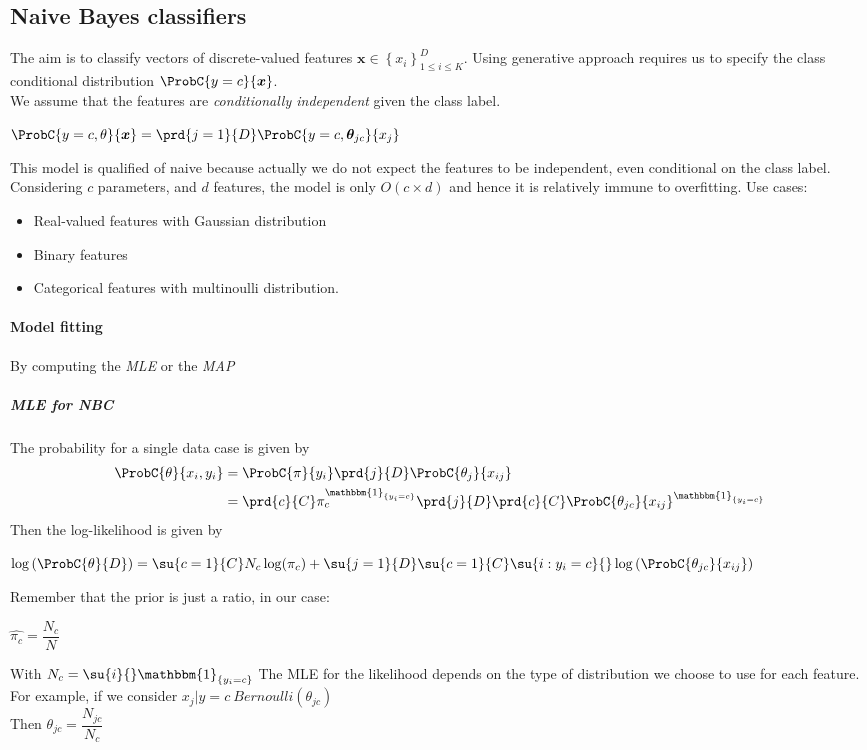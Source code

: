 \subsection{Naive Bayes classifiers}
The aim is to classify vectors of discrete-valued features $\bm{x}\in 
\left\{x_{i}\right\}^{D}_{1\leq i\leq K}$. Using generative approach requires us to 
specify the class conditional distribution $\ProbC{y=c}{\bm{x}}$.\\
We assume that the features are \emph{conditionally independent} given the class label.
\begin{center}
    $\ProbC{y=c, \theta}{\bm{x}} = \prd{j=1}{D}\ProbC{y=c,\bm{\theta}_{jc}}{x_{j}}$
\end{center}
This model is qualified of naive because actually we do not expect the features to be
independent, even conditional on the class label.\\
Considering $c$ parameters, and $d$ features, the model is only $O(c\times d)$ and hence 
it is relatively immune to overfitting.
Use cases: 
\begin{itemize}
    \item Real-valued features with Gaussian distribution
    \item Binary features
    \item Categorical features with multinoulli distribution.
\end{itemize}


\paragraph{Model fitting}
By computing the \emph{MLE} or the \emph{MAP}

\subparagraph{MLE for NBC}
The probability for a single data case is given by
\begin{align*}
    \ProbC{\theta}{x_{i}, y_{i}} 
    &= \ProbC{\pi}{y_{i}} \prd{j}{D}\ProbC{\theta_{j}}{x_{ij}}\\ 
    &= \prd{c}{C}\pi^{\mathbbm{1}_{\{y_{i}=c\}}}_{c}\prd{j}{D}\prd{c}{C}
    \ProbC{\theta_{jc}}{x_{ij}}^{\mathbbm{1}_{\{y_{i}=c\}}}
\end{align*}
Then the log-likelihood is given by 
\begin{center}
    $\log\left(\ProbC{\theta}{D}\right) = 
    \su{c=1}{C}N_{c}\log(\pi_{c}) + \su{j=1}{D}\su{c=1}{C}\su{i:y_{i}=c}{}
    \log \left(\ProbC{\theta_{jc}}{x_{ij}}\right)$
\end{center}
Remember that the prior is just a ratio, in our case: 
\begin{center}
    $\hat{\pi_{c}} = \dfrac{N_{c}}{N}$
\end{center}
With $N_{c} = \su{i}{}\mathbbm{1}_{\{y_{i}=c\}}$ 
The MLE for the likelihood depends on the type of distribution we choose to use for each
feature. For example, if we consider $x_{j}|y=c ~ Bernoulli(\theta_{jc})$\\
Then $\theta_{jc} = \dfrac{N_{jc}}{N_{c}}$

